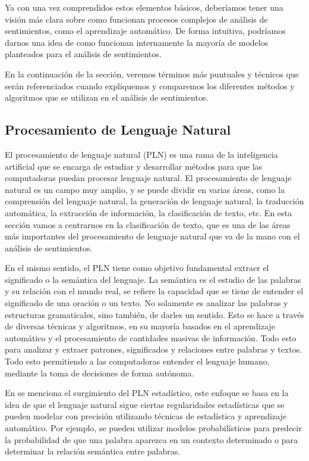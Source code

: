 \documentclass[conference]{IEEEtran}
\begin{document}
Ya con una vez comprendidos estos elementos básicos, deberíamos tener una visión más clara sobre como funcionan procesos complejos de análisis de sentimientos, como el aprendizaje automático. De forma intuitiva, podríamos darnos una idea de como funcionan internamente la mayoría de modelos planteados para el análisis de sentimientos.

En la continuación de la sección, veremos términos más puntuales y técnicos que serán referenciados cuando expliquemos y comparemos los diferentes métodos y algoritmos que se utilizan en el análisis de sentimientos.

\subsection{Procesamiento de Lenguaje Natural}

El procesamiento de lenguaje natural (PLN) es una rama de la inteligencia artificial que se encarga de estudiar y desarrollar métodos para que las computadoras puedan procesar lenguaje natural. 
El procesamiento de lenguaje natural es un campo muy amplio, y se puede dividir en varias áreas, como la comprensión del lenguaje natural, la generación de lenguaje natural, la traducción automática, la extracción de información, la clasificación de texto, etc. 
En esta sección vamos a centrarnos en la clasificación de texto, que es una de las áreas más importantes del procesamiento de lenguaje natural que va de la mano con el análisis de sentimientos.

En el mismo sentido, el PLN tiene como objetivo fundamental extraer el significado o la semántica del lenguaje. 
La semántica es el estudio de las palabras y su relación con el mundo real, se refiere la capacidad que se tiene de entender el significado de una oración o un texto. 
No solamente es analizar las palabras y estructuras gramaticales, sino también, de darles un sentido. 
Esto se hace a través de diversas técnicas y algoritmos, en su mayoría basados en el aprendizaje automático y el procesamiento de cantidades masivas de información. 
Todo esto para analizar y extraer patrones, significados y relaciones entre palabras y textos. 
Todo esto permitiendo a las computadoras entender el lenguaje humano, mediante la toma de decisiones de forma autónoma.

En \cite{b6} se menciona el surgimiento del PLN estadístico, este enfoque se basa en la idea de que el lenguaje natural sigue ciertas regularidades estadísticas que se pueden modelar con precisión utilizando técnicas de estadística y aprendizaje automático. Por ejemplo, se pueden utilizar modelos probabilísticos para predecir la probabilidad de que una palabra aparezca en un contexto determinado o para determinar la relación semántica entre palabras.
\end{document}
